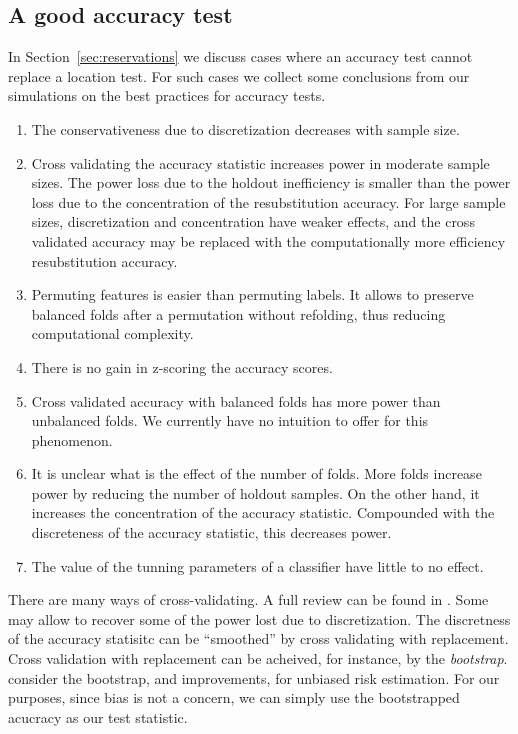 \documentclass[12pt,a4paper]{article}
\begin{document}
\subsection{A good accuracy test}
In Section~\ref{sec:reservations} we discuss cases where an accuracy test cannot replace a location test.
For such cases we collect some conclusions from our simulations on the best practices for accuracy tests.
\begin{enumerate}
\item The conservativeness due to discretization decreases with sample size. 
\item Cross validating the accuracy statistic increases power in moderate sample sizes. 
The power loss due to the holdout inefficiency is smaller than the power loss due to the concentration of the resubstitution accuracy. 
For large sample sizes, discretization and concentration have weaker effects, and the cross validated accuracy may be replaced with the computationally more efficiency resubstitution accuracy.
\item Permuting features is easier than permuting labels. 
It allows to preserve balanced folds after a permutation without refolding, thus reducing computational complexity.
\item There is no gain in z-scoring the accuracy scores. 
\item Cross validated accuracy with balanced folds has more power than unbalanced folds. We currently have no intuition to offer for this phenomenon. %
\item It is unclear what is the effect of the number of folds. More folds increase power by reducing the number of holdout samples. 
On the other hand, it increases the concentration of the accuracy statistic. Compounded with the discreteness of the accuracy statistic, this decreases power. 
\item The value of the tunning parameters of a classifier have little to no effect. 
\end{enumerate}

There are many ways of cross-validating. 
A full review can be found in \cite{arlot_survey_2010}.
Some may allow to recover some of the power lost due to discretization. 
The discretness of the accuracy statisitc can be ``smoothed'' by cross validating with replacement. 
Cross validation with replacement can be acheived, for instance, by the \emph{bootstrap}. 
\cite{efron_improvements_1997} consider the bootstrap, and improvements, for unbiased risk estimation.
For our purposes, since bias is not a concern, we can simply use the bootstrapped acucracy as our test statistic.
\end{document}
